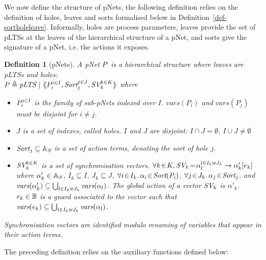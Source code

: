 \documentclass{lmcs}
\newtheorem{definition}{Definition}
\begin{document}
We now define the structure of pNets, the following definition relies on the definition 
of holes, leaves and sorts formalised below in Definition~\ref{def-sortholeleave}. Informally, holes are process parameters, leaves provide the set of pLTSs at the leaves of the hierarchical structure of a pNet, and sorts give the signature of a pNet, i.e. the actions it exposes.

\begin{definition}[pNets]\label{def-pnets}
A pNet $P$ is a hierarchical structure where leaves are pLTSs and holes:\\
$\pNet\triangleq \pLTS~|~\mylangle \pNet_i^{i\in I}, \Sort_j^{j\in J}, \symb{SV}_k^{k\in 
K}\myrangle$
where
\begin{itemize}
\item[$\bullet$] $P_i^{i\in I}$ is the family of sub-pNets indexed over $I$. $vars(P_i)$ and $vars(P_j)$ must be disjoint for $i\neq j$.

\item[$\bullet$] $J$ is a set of indexes, called \emph{holes}.
$I$ and $J$ are \emph{disjoint}: $I\!\cap\! J=\emptyset$,  $I\!\cup\! J\neq\emptyset$
\item[$\bullet$] $\Sort_j \subseteq \AlgAS$  is a set of action terms, denoting the 
\emph{sort} of
hole $j$.

\item[$\bullet$] $\symb{SV}_k^{k\in K}$ is a set of
  synchronisation vectors. $\forall k\!\in\! K,
  \symb{SV}_k\!=\!\SV{\alpha_{l}^{l\in I_k \uplus J_k}}{\alpha'_k}{e_k}$ where
  $\alpha'_k\in \mathbb{A}_S$, $I_k\subseteq I$, $J_k\subseteq J$,
  $\forall i\!\in\!
  I_k.\,\alpha_{i}\!\in\!\Sort(\pNet_i)$,  $\forall j\!\in\!
  J_k.\,\alpha_{j}\!\in\!\Sort_j$, and $\vars(\alpha'_k)\subseteq \bigcup_{l\in I_k\uplus 
  J_k}{\vars({\alpha_l})}$. The global action of a vector $\symb{SV}_k$ is
$\alpha'_k$. $e_k \in \mathbb{B}$ is a guard associated to the vector such that
$\vars(e_k)\subseteq \bigcup_{l\in I_k\uplus J_k}{\vars({\alpha_l})}$.
\end{itemize}
Synchronisation vectors are identified modulo renaming of variables that appear in their 
action terms.
\end{definition}

The preceding definition relies on the auxiliary functions defined below:
\end{document}
